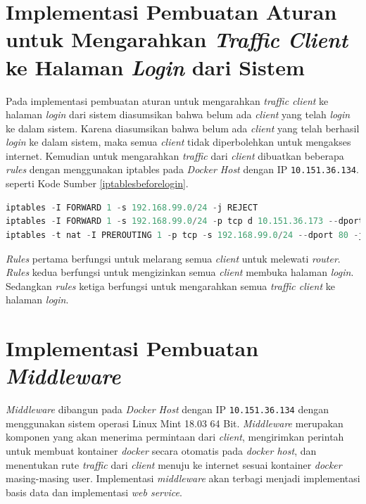 \section{Implementasi Pembuatan Aturan untuk Mengarahkan \textit{Traffic Client} ke Halaman \textit{Login} dari Sistem}
Pada implementasi pembuatan aturan untuk mengarahkan \textit{traffic client} ke halaman \textit{login} dari sistem diasumsikan bahwa belum ada \textit{client} yang telah \textit{login} ke dalam sistem. Karena diasumsikan bahwa belum ada \textit{client} yang telah berhasil \textit{login} ke dalam sistem, maka semua \textit{client} tidak diperbolehkan untuk mengakses internet. Kemudian untuk mengarahkan \textit{traffic} dari \textit{client} dibuatkan beberapa \textit{rules} dengan menggunakan iptables pada \textit{Docker Host} dengan IP \texttt{10.151.36.134}. seperti Kode Sumber \ref{iptablesbeforelogin}.
\begin{lstlisting}[frame=single,tabsize=2,breaklines,captionpos=b,caption=Command untuk mengarahkan \textit{client} ke halaman \textit{login},language=Python,label=iptablesbeforelogin]
iptables -I FORWARD 1 -s 192.168.99.0/24 -j REJECT
iptables -I FORWARD 1 -s 192.168.99.0/24 -p tcp d 10.151.36.173 --dport 4000 -j ACCEPT
iptables -t nat -I PREROUTING 1 -p tcp -s 192.168.99.0/24 --dport 80 -j DNAT --to 10.151.36.173:4000
\end{lstlisting}

\indent \textit{Rules} pertama berfungsi untuk melarang semua \textit{client} untuk melewati \textit{router}. \textit{Rules} kedua berfungsi untuk mengizinkan semua \textit{client} membuka halaman \textit{login}. Sedangkan \textit{rules} ketiga berfungsi untuk mengarahkan semua \textit{traffic client} ke halaman \textit{login}.

\section{Implementasi Pembuatan \textit{Middleware}}
\textit{Middleware} dibangun pada \textit{Docker Host} dengan IP \texttt{10.151.36.134} dengan menggunakan sistem operasi Linux Mint 18.03 64 Bit. \textit{Middleware} merupakan komponen yang akan menerima permintaan dari \textit{client}, mengirimkan perintah untuk membuat kontainer \textit{docker} secara otomatis pada \textit{docker host}, dan menentukan rute \textit{traffic} dari \textit{client} menuju ke internet sesuai kontainer \textit{docker} masing-masing user. Implementasi \textit{middleware} akan terbagi menjadi implementasi basis data dan implementasi \textit{web service}.

